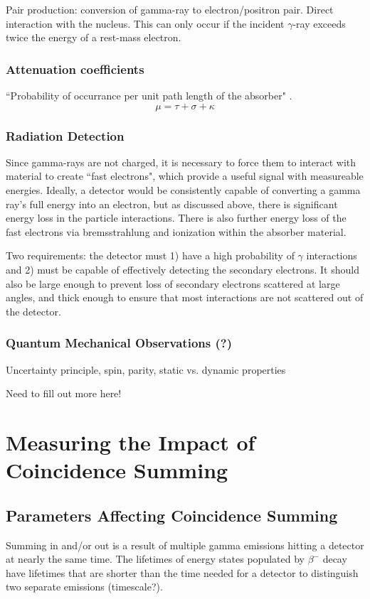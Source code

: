 \documentclass[12pt,twoside]{reedthesis}
\begin{document}
Pair production: conversion of gamma-ray to electron/positron pair. Direct interaction with the nucleus. This can only occur if the incident $\gamma$-ray exceeds twice the energy of a rest-mass electron.

\subsection{Attenuation coefficients}
``Probability of occurrance per unit path length of the absorber" \cite{Knoll}.
    \begin{equation}
     \mu = \tau + \sigma + \kappa
     \label{attenuation}
     \end{equation}

\subsection{Radiation Detection}
	Since gamma-rays are not charged, it is necessary to force them to interact with material to create ``fast electrons", which provide a useful signal with measureable energies. Ideally, a detector would be consistently capable of converting a gamma ray's full energy into an electron, but as discussed above, there is significant energy loss in the particle interactions. There is also further energy loss of the fast electrons via bremsstrahlung and ionization within the absorber material.
	
	Two requirements: the detector must 1) have a high probability of $\gamma$ interactions and 2) must be capable of effectively detecting the secondary electrons. It should also be large enough to prevent loss of secondary electrons scattered at large angles, and thick enough to ensure that most interactions are not scattered out of the detector.
\subsection{Quantum Mechanical Observations (?)}
  Uncertainty principle, spin, parity, static vs. dynamic properties
  
  Need to fill out more here!
  
\chapter{Measuring the Impact of Coincidence Summing}
 
\section{Parameters Affecting Coincidence Summing}
Summing in and/or out is a result of multiple gamma emissions hitting a detector at nearly the same time. The lifetimes of energy states populated by $\beta^{-}$ decay have lifetimes that are shorter than the time needed for a detector to distinguish two separate emissions (timescale?). 
\end{document}
